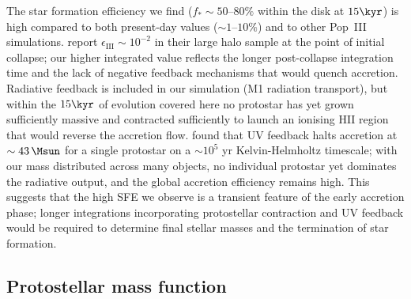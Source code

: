 The star formation efficiency we find ($f_* \sim 50$--$80\%$ within
the disk at $15\kyr$) is high compared to both present-day values
($\sim 1$--$10\%$) and to other Pop~III simulations.
\citet{hirano_sakai23} report $\epsilon_\mathrm{III} \sim 10^{-2}$
in their large halo sample at the point of initial collapse; our
higher integrated value reflects the longer post-collapse integration
time and the lack of negative feedback mechanisms that would quench
accretion.
Radiative feedback is included in our simulation (M1 radiation
transport), but within the $15\kyr$ of evolution covered here no
protostar has yet grown sufficiently massive and contracted
sufficiently to launch an ionising H{\small II} region that would
reverse the accretion flow.
\citet{hosokawa11} found that UV feedback halts accretion at
$\sim 43\,\Msun$ for a single protostar on a $\sim 10^5$ yr
Kelvin-Helmholtz timescale; with our mass distributed across
many objects, no individual protostar yet dominates the radiative
output, and the global accretion efficiency remains high.
This suggests that the high SFE we observe is a transient feature of
the early accretion phase; longer integrations incorporating
protostellar contraction and UV feedback would be required to
determine final stellar masses and the termination of star formation.

\subsection*{Protostellar mass function}

